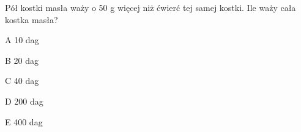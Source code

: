\begin{tresc}
Pół kostki masła waży o 50 g więcej niż ćwierć tej samej kostki. Ile waży cała kostka masła?
\end{tresc}
\begin{wariant}{A} 10 dag \end{wariant}
\begin{wariant}{B} 20 dag \end{wariant}
\begin{wariant}{C} 40 dag \end{wariant}
\begin{wariant}{D} 200 dag \end{wariant}
\begin{wariant}{E} 400 dag \end{wariant}
